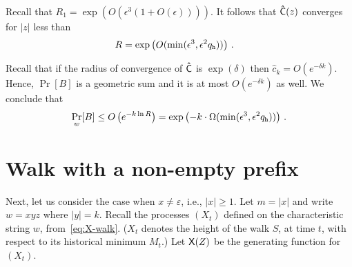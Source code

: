   Recall that $R_1 = \exp\left(O(\epsilon^3 (1 + O(\epsilon)))\right)$. 
  It follows that $\mathsf{\hat{C}}(z)$ converges for 
  $|z|$ less than 
  \begin{align}\label{eq:RoC-unique-honest}
    R &= \exp\left(O(\min(\epsilon^3, \epsilon^2 q_{\mathtt{h}}))\right)
    \,.
  \end{align}

  Recall that if the radius of convergence of
  $\mathsf{\hat{C}}$ is $\exp(\delta)$ then 
  $\hat{c}_k = O(e^{-\delta k})$. 
  Hence, $\Pr[B]$ is a geometric sum and it is 
  at most $O(e^{-\delta k})$ as well. 
  We conclude that 
  $$
    \Pr_w[B] 
      \leq O\left(e^{-k \ln R }\right)
      = \exp\left(-k\cdot \Omega(\min(\epsilon^3, \epsilon^2 q_{\mathtt{h}}))\right)
      \,.
  $$




\section{Walk with a non-empty prefix}
  Next, let us consider the case when $x \neq \varepsilon$, i.e., $|x| \geq 1$. 
  Let $m = |x|$ and write $w = xyz$ where $|y| = k$. 
  Recall the processes $(X_t)$ defined on the characteristic string $w$, 
  from~\eqref{eq:X-walk}.
  ($X_t$ denotes the height of the walk $S$, at time $t$, 
  with respect to its historical minimum $M_t$.)
  Let $\mathsf{X}(Z)$ be the generating function for $(X_t)$.

